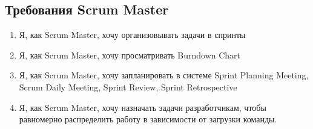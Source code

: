 \documentclass{article}
\begin{document}
\subsection{Требования Scrum Master}
\begin{enumerate}[label=\textbf{SMR\arabic*}.]
  \item Я, как Scrum Master, хочу организовывать задачи в спринты
  \item Я, как Scrum Master, хочу просматривать Burndown Chart
  \item Я, как Scrum Master, хочу запланировать в системе
    Sprint Planning Meeting, Scrum Daily Meeting, Sprint Review, Sprint Retrospective
  \item Я, как Scrum Master, хочу назначать задачи разработчикам, чтобы равномерно распределить работу в зависимости от загрузки команды.
\end{enumerate}

\printnoidxglossaries
\end{document}
